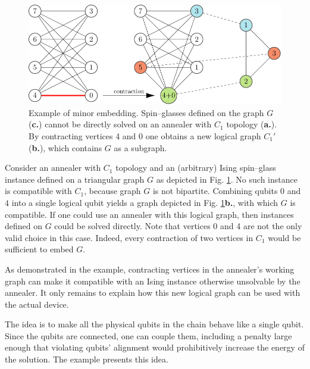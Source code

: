 \begin{example}
\label{ex:minor-embedding}
\begin{figure}[b]
    \includegraphics[width=\textwidth]{figures/minor-embedding}
    \caption{
        Example of minor embedding. Spin--glasses defined on the graph $G$ (\textbf{c.}) cannot
        be directly solved on an annealer with $C_1$ topology (\textbf{a.}). By contracting vertices
        4 and 0 one obtains a new logical graph $C_1'$ (\textbf{b.}), which contains $G$ as a
        subgraph.
    }
    \label{fig:minor-embedding}
\end{figure}

Consider an annealer with $C_1$ topology and an (arbitrary) Ising spin--glass instance
defined on a triangular graph $G$ as depicted in Fig. \ref{fig:minor-embedding}. No
such instance is compatible with $C_1$, because graph $G$ is not bipartite. Combining qubits $0$
and $4$ into a single logical qubit yields a graph depicted in Fig.
\ref{fig:minor-embedding}\textbf{b.}, with which $G$ is compatible. If one could use an annealer
with this logical graph, then instances defined on $G$ could be solved directly. Note that vertices
0 and 4 are not the only valid choice in this case. Indeed, every contraction of two vertices in
$C_1$ would be sufficient to embed $G$.
\end{example}

As demonstrated in the example, contracting vertices in the annealer's working graph can make it
compatible with an Ising instance otherwise unsolvable by the annealer. It only remains to
explain how this new logical graph can be used with the actual device.

The idea is to make all the physical qubits in the chain behave like a single qubit. Since the
qubits are connected, one can couple them, including a penalty large enough that violating qubits'
alignment would prohibitively increase the energy of the solution. The example presents this idea.

